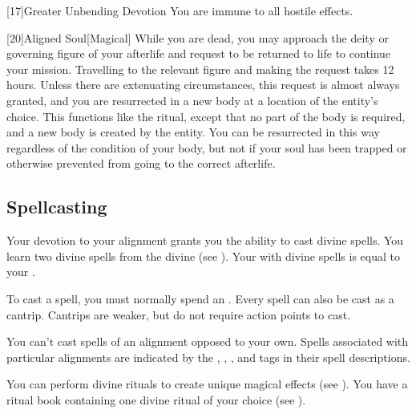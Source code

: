             [17]{Greater Unbending Devotion}
            You are immune to all hostile  effects.

            [20]{Aligned Soul}[Magical]
            While you are dead, you may approach the deity or governing figure of your afterlife and request to be returned to life to continue your mission.
            Travelling to the relevant figure and making the request takes 12 hours.
            Unless there are extenuating circumstances, this request is almost always granted, and you are resurrected in a new body at a location of the entity's choice.
            This functions like the  ritual, except that no part of the body is required, and a new body is created by the entity.
            You can be resurrected in this way regardless of the condition of your body, but not if your soul has been trapped or otherwise prevented from going to the correct afterlife.

        \subsection{Spellcasting}

            Your devotion to your alignment grants you the ability to cast divine spells.
            You learn two divine spells from the divine  (see ).
            Your  with divine spells is equal to your .

            To cast a spell, you must normally spend an .
            Every spell can also be cast as a cantrip.
            Cantrips are weaker, but do not require action points to cast.

            You can't cast spells of an alignment opposed to your own.
            Spells associated with particular alignments are indicated by the , , , and  tags in their spell descriptions.

            You can perform divine rituals to create unique magical effects (see ).
            You have a ritual book containing one divine ritual of your choice (see ).

